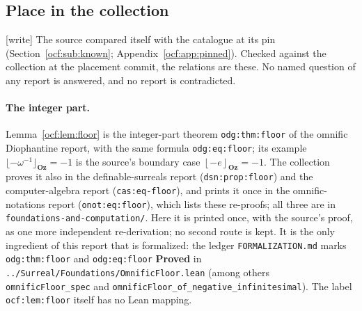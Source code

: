 \documentclass[11pt,a4paper]{article}
\numberwithin{equation}{section}
\theoremstyle{definition}
\theoremstyle{remark}
\newcommand{\Oz}{\mathbf{Oz}}
\newcommand{\fl}[1]{\left\lfloor#1\right\rfloor_{\Oz}}
\newcommand{\rpath}[1]{\nolinkurl{#1}}%
\newcommand{\lbl}[1]{\nolinkurl{#1}}%
\newcommand{\wtag}{\textup{[write]}}%
\begin{document}
\subsection{Place in the collection}\label{ocf:sec:collection}

\wtag{} The source compared itself with the catalogue at its pin
(Section~\ref{ocf:sub:known}; Appendix~\ref{ocf:app:pinned}). Checked
against the collection at the placement commit, the relations are these.
No named question of any report is answered, and no report is contradicted.

\paragraph{The integer part.} Lemma~\ref{ocf:lem:floor} is the
integer-part theorem \lbl{odg:thm:floor} of the omnific Diophantine report,
with the same formula \lbl{odg:eq:floor}; its example
$\lfloor-\omega^{-1}\rfloor_{\Oz}=-1$ is the source's boundary case
$\fl{-e}=-1$. The collection proves it also in
the definable-surreals report (\lbl{dsn:prop:floor}) and the
computer-algebra report (\lbl{cas:eq-floor}), and prints it once in the
omnific-notations report (\lbl{onot:eq:floor}), which lists these
re-proofs; all three are in \rpath{foundations-and-computation/}. Here it is printed
once, with the source's proof, as one more independent re-derivation; no
second route is kept. It is the only ingredient of this report that is
formalized: the ledger \rpath{FORMALIZATION.md} marks \lbl{odg:thm:floor}
and \lbl{odg:eq:floor} \textbf{Proved} in
\rpath{../Surreal/Foundations/OmnificFloor.lean} (among others \texttt{omnificFloor\_spec} and
\texttt{omnificFloor\_of\_negative\_infinitesimal}). The label
\texttt{ocf:lem:floor} itself has no Lean mapping.
\end{document}
